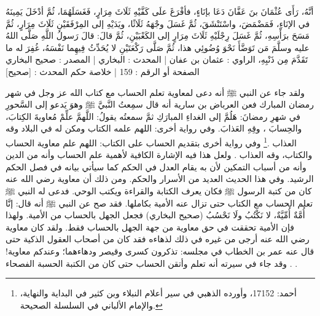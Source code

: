 أنَّهُ، رَأَى عُثْمَانَ بنَ عَفَّانَ دَعَا بإنَاءٍ، فأفْرَغَ علَى كَفَّيْهِ ثَلَاثَ مِرَارٍ، فَغَسَلَهُمَا، ثُمَّ أدْخَلَ يَمِينَهُ في الإنَاءِ، فَمَضْمَضَ، واسْتَنْشَقَ، ثُمَّ غَسَلَ وجْهَهُ ثَلَاثًا، ويَدَيْهِ إلى المِرْفَقَيْنِ ثَلَاثَ مِرَارٍ، ثُمَّ مَسَحَ برَأْسِهِ، ثُمَّ غَسَلَ رِجْلَيْهِ ثَلَاثَ مِرَارٍ إلى الكَعْبَيْنِ، ثُمَّ قالَ: قالَ رَسولُ اللَّهِ صَلَّى اللهُ عليه وسلَّمَ مَن تَوَضَّأَ نَحْوَ وُضُوئِي هذا، ثُمَّ صَلَّى رَكْعَتَيْنِ لا يُحَدِّثُ فِيهِما نَفْسَهُ، غُفِرَ له ما تَقَدَّمَ مِن ذَنْبِهِ،
الراوي : عثمان بن عفان | المحدث : البخاري | المصدر : صحيح البخاري
الصفحة أو الرقم : 159 | خلاصة حكم المحدث : [صحيح]

ولقد جاء عن النبي ﷺ أنه دعى لمعاوية تعلم الحساب مع كتاب الله عز وجل في شهر رمضان المبارك فعن العرباض بن سارية أنه قال سمِعتُ النَّبيَّ ﷺ وهوَ يَدعو إلى السَّحورِ في شهرِ رمضانَ: هَلُمَّ إلى الغداءِ المبارَكِ ثمَّ سمعتُه يقولُ: اللَّهمَّ علِّمْ مُعاويةَ الكِتابَ، والحِسابَ ، وقِهِ العَذابَ. وفي رواية أخرى: اللهم علمه الكتاب ومكن له في البلاد وقه العذاب \href{https://shamela.ws/book/25794/13683#p2}{\faExternalLink}\href{https://shamela.ws/book/22669/1909#p2}{\faExternalLink}\href{https://shamela.ws/book/4445/6628#p1}{\faExternalLink}\href{https://shamela.ws/book/9442/5496#p12}{\faExternalLink} \cite{ahmid}\cite{dahabi_Siyar}\cite{ibnKathir_AlBidayah}\cite{albani_Sahiha}.\footnote{أحمد: 17152، وأورده الذهبي في سير أعلام النبلاء وبن كثير في البداية والنهاية، والإمام الألباني في السلسلة الصحيحة.} وفي رواية أخرى بتقديم الحساب على الكتاب: اللهم علم معاوية الحساب والكتاب، وقه العذاب \href{https://shamela.ws/book/20879/1060#p1}{\faExternalLink}\href{https://shamela.ws/book/23100/2493#p1}{\faExternalLink}. ولعل هذا فيه الإشارة الكافية لأهمية علم الحساب وأنه من الدين وأنه من أسباب التمكين لأن به يقام العدل في الحكم كما سيأتي بيانه في فصل الحكم الرشيد. وفي هذا الحديث العديد من الأسرار والحكم. ومن ذلك أن معاوية رضي الله عنه كان من كتبة الرسول ﷺ فكان يعرف الكتابة والقراءة ويكتب الوحي. فدعى له النبي ﷺ تعلم الحساب مع الكتاب حتى تزال عنه الأمية بكاملها. فقد صح عن النبي ﷺ أنه قال: إنَّا أُمَّةٌ أُمِّيَّةٌ، لا نَكْتُبُ ولَا نَحْسُبُ {\footnotesize (صحيح البخاري)} فجعل الجهل بالحساب من الأمية. ولهذا فإن الأمية تحققت في حق معاوية من جهة الجهل بالحساب فقط. ولقد كان معاوية رضي الله عنه أرجى من غيره في ذلك لذهاءه فقد كان من أصحاب العقول الذكية حتى قال عنه عمر بن الخطاب في مجلسه: تذكرون كسرى وقيصر ودهاءهما؛ وعندكم معاوية! \href{https://shamela.ws/book/9783/2790#p3}{\faExternalLink} \cite{ibnJareerTabari_Tareekh}. وقد جاء في سيرته أنه تعلم وأتقن الحساب حتى كان من الكتبة الحسبة الفصحاء \href{https://shamela.ws/book/12286/6715#p6}{\faExternalLink} \href{https://shamela.ws/book/7299/5215#p3}{\faExternalLink}. 

